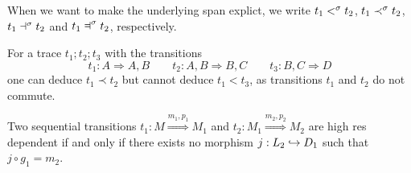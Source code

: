 When we want to make the underlying span explict, we write $t_1 <^{\sigma} t_2$, $t_1 \prec^{\sigma} t_2$, $t_1 \dashv^{\sigma} t_2$ and $t_1 \Dashv^{\spa} t_2$, respectively.

\begin{example}
  For a trace $t_1;t_2;t_3$ with the transitions
  \[
  t_1: A \Rightarrow A,B\qquad t_2: A,B\Rightarrow B,C \qquad t_3: B,C\Rightarrow D
  \]
  one can deduce $t_1\prec t_2$ but cannot deduce $t_1<t_3$, as transitions $t_1$ and $t_2$ do not commute.
\end{example}

\begin{lemma}
  \label{lem:seq_dep}
  Two sequential transitions $t_1:M\overset{m_1,p_1}{\Rightarrow} M_1$ and $t_2:M_1\overset{m_2,p_2}{\Rightarrow} M_2$ are high res dependent if and only if there exists no morphism $j:L_2\hookrightarrow D_1$ such that $j\circ g_1= m_2$.
\end{lemma}
